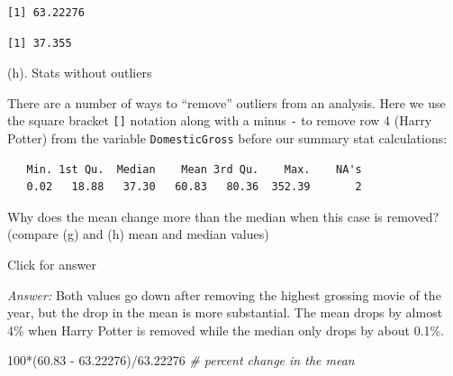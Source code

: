 \documentclass[
]{book}
\newenvironment{Shaded}{\begin{snugshade}}{\end{snugshade}}
\newcommand{\AttributeTok}[1]{\textcolor[rgb]{0.77,0.63,0.00}{#1}}
\newcommand{\CommentTok}[1]{\textcolor[rgb]{0.56,0.35,0.01}{\textit{#1}}}
\newcommand{\ConstantTok}[1]{\textcolor[rgb]{0.00,0.00,0.00}{#1}}
\newcommand{\DecValTok}[1]{\textcolor[rgb]{0.00,0.00,0.81}{#1}}
\newcommand{\FloatTok}[1]{\textcolor[rgb]{0.00,0.00,0.81}{#1}}
\newcommand{\FunctionTok}[1]{\textcolor[rgb]{0.00,0.00,0.00}{#1}}
\newcommand{\NormalTok}[1]{#1}
\newcommand{\SpecialCharTok}[1]{\textcolor[rgb]{0.00,0.00,0.00}{#1}}
\begin{document}
\begin{verbatim}
[1] 63.22276
\end{verbatim}

\begin{Shaded}
\end{Shaded}

\begin{verbatim}
[1] 37.355
\end{verbatim}

(h). Stats without outliers

There are a number of ways to ``remove'' outliers from an analysis. Here we use the square bracket \texttt{{[}{]}} notation along with a minus \texttt{-} to remove row 4 (Harry Potter) from the variable \texttt{DomesticGross} before our summary stat calculations:

\begin{Shaded}
\end{Shaded}

\begin{verbatim}
   Min. 1st Qu.  Median    Mean 3rd Qu.    Max.    NA's 
   0.02   18.88   37.30   60.83   80.36  352.39       2 
\end{verbatim}

Why does the mean change more than the median when this case is removed? (compare (g) and (h) mean and median values)

Click for answer

\emph{Answer:} Both values go down after removing the highest grossing movie of the year, but the drop in the mean is more substantial. The mean drops by almost 4\% when Harry Potter is removed while the median only drops by about 0.1\%.

\begin{Shaded}
\begin{Highlighting}[]
\DecValTok{100}\SpecialCharTok{*}\NormalTok{(}\FloatTok{60.83} \SpecialCharTok{{-}} \FloatTok{63.22276}\NormalTok{)}\SpecialCharTok{/}\FloatTok{63.22276} \CommentTok{\# percent change in the mean}
\end{Highlighting}
\end{Shaded}
\end{document}
